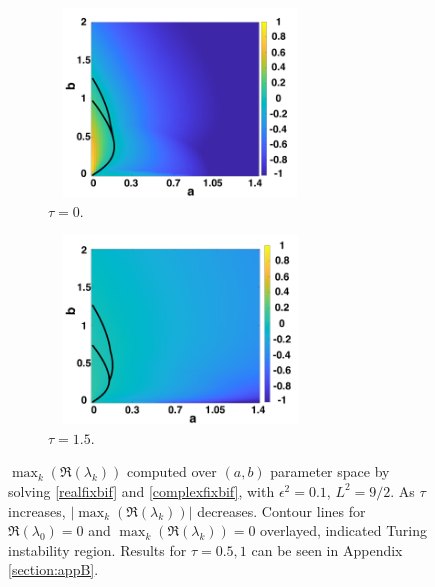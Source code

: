 \begin{figure}[H]
    \centering
    \begin{subfigure}[t]{0.45\textwidth}
        \centering
        \includegraphics[width=7cm,height=5cm]{fixbif21.png}
        \caption{$\tau=0$.}
        \label{}
    \end{subfigure}
    \hfill
    \begin{subfigure}[t]{0.45\textwidth}
        \centering
        \includegraphics[width=7cm,height=5cm]{fixbif24.png}
        \caption{$\tau=1.5$.}
        \label{}
    \end{subfigure}
    \caption{$\max_k(\Re(\lambda_k))$ computed over $(a,b)$ parameter space by solving \eqref{realfixbif} and \eqref{complexfixbif}, with $\epsilon^2=0.1$, $L^2=9/2$. As $\tau$ increases, $|\max_k(\Re(\lambda_k))|$ decreases. Contour lines for $\Re(\lambda_0)=0$ and $\max_k(\Re(\lambda_k))=0$ overlayed, indicated Turing instability region. Results for $\tau=0.5,1$ can be seen in Appendix \ref{section:appB}.}
    \label{fig:fixbif2}
\end{figure}
